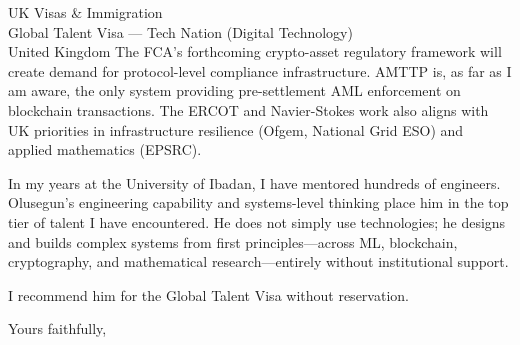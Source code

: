 \documentclass[12pt,a4paper]{letter}
\begin{document}
\begin{letter}{UK Visas \& Immigration\\
Global Talent Visa --- Tech Nation (Digital Technology)\\
United Kingdom}
The FCA's forthcoming crypto-asset regulatory framework will create
demand for protocol-level compliance infrastructure.  AMTTP is, as far
as I am aware, the only system providing pre-settlement AML enforcement
on blockchain transactions.  The ERCOT and Navier-Stokes work also
aligns with UK priorities in infrastructure resilience (Ofgem, National
Grid ESO) and applied mathematics (EPSRC).

In my years at the University of Ibadan, I have mentored hundreds of
engineers.  Olusegun's engineering capability and systems-level thinking
place him in the top tier of talent I have encountered.  He does not
simply use technologies; he designs and builds complex systems from first
principles---across ML, blockchain, cryptography, and mathematical
research---entirely without institutional support.

I recommend him for the Global Talent Visa without reservation.

\closing{Yours faithfully,}

\end{letter}
\end{document}
